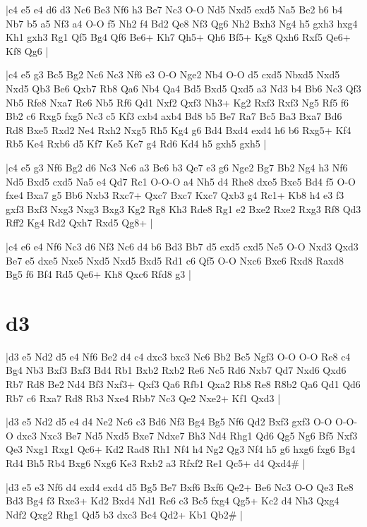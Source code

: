\whitename{}
\blackname{}
\makegametitle
|c4 e5 e4 d6 d3 Nc6 Be3 Nf6 h3 Be7 Nc3 O-O Nd5 Nxd5 exd5 Na5 Be2 b6 b4 Nb7 b5 a5 Nf3 a4 O-O f5 Nh2 f4 Bd2 Qe8 Nf3 Qg6 Nh2 Bxh3 Ng4 h5 gxh3 hxg4 Kh1 gxh3 Rg1 Qf5 Bg4 Qf6 Be6+ Kh7 Qh5+ Qh6 Bf5+ Kg8 Qxh6 Rxf5 Qe6+ Kf8 Qg6  |

\whitename{}
\blackname{}
\makegametitle
|c4 e5 g3 Bc5 Bg2 Nc6 Nc3 Nf6 e3 O-O Nge2 Nb4 O-O d5 cxd5 Nbxd5 Nxd5 Nxd5 Qb3 Be6 Qxb7 Rb8 Qa6 Nb4 Qa4 Bd5 Bxd5 Qxd5 a3 Nd3 b4 Bb6 Nc3 Qf3 Nb5 Rfe8 Nxa7 Re6 Nb5 Rf6 Qd1 Nxf2 Qxf3 Nh3+ Kg2 Rxf3 Rxf3 Ng5 Rf5 f6 Bb2 c6 Rxg5 fxg5 Nc3 c5 Kf3 cxb4 axb4 Bd8 b5 Be7 Ra7 Bc5 Ba3 Bxa7 Bd6 Rd8 Bxe5 Rxd2 Ne4 Rxh2 Nxg5 Rh5 Kg4 g6 Bd4 Bxd4 exd4 h6 b6 Rxg5+ Kf4 Rb5 Ke4 Rxb6 d5 Kf7 Ke5 Ke7 g4 Rd6 Kd4 h5 gxh5 gxh5  |



\whitename{}
\blackname{}
\makegametitle
|c4 e5 g3 Nf6 Bg2 d6 Nc3 Nc6 a3 Be6 b3 Qe7 e3 g6 Nge2 Bg7 Bb2 Ng4 h3 Nf6 Nd5 Bxd5 cxd5 Na5 e4 Qd7 Rc1 O-O-O a4 Nh5 d4 Rhe8 dxe5 Bxe5 Bd4 f5 O-O fxe4 Bxa7 g5 Bb6 Nxb3 Rxc7+ Qxc7 Bxc7 Kxc7 Qxb3 g4 Rc1+ Kb8 h4 e3 f3 gxf3 Bxf3 Nxg3 Nxg3 Bxg3 Kg2 Rg8 Kh3 Rde8 Rg1 e2 Bxe2 Rxe2 Rxg3 Rf8 Qd3 Rff2 Kg4 Rd2 Qxh7 Rxd5 Qg8+  |

\whitename{}
\blackname{}
\makegametitle
|c4 e6 e4 Nf6 Nc3 d6 Nf3 Nc6 d4 b6 Bd3 Bb7 d5 exd5 cxd5 Ne5 O-O Nxd3 Qxd3 Be7 e5 dxe5 Nxe5 Nxd5 Nxd5 Bxd5 Rd1 c6 Qf5 O-O Nxc6 Bxc6 Rxd8 Raxd8 Bg5 f6 Bf4 Rd5 Qe6+ Kh8 Qxc6 Rfd8 g3  |

\section{d3}

\whitename{}
\blackname{}
\makegametitle
|d3 e5 Nd2 d5 e4 Nf6 Be2 d4 c4 dxc3 bxc3 Nc6 Bb2 Bc5 Ngf3 O-O O-O Re8 c4 Bg4 Nb3 Bxf3 Bxf3 Bd4 Rb1 Bxb2 Rxb2 Re6 Nc5 Rd6 Nxb7 Qd7 Nxd6 Qxd6 Rb7 Rd8 Be2 Nd4 Bf3 Nxf3+ Qxf3 Qa6 Rfb1 Qxa2 Rb8 Re8 R8b2 Qa6 Qd1 Qd6 Rb7 c6 Rxa7 Rd8 Rb3 Nxe4 Rbb7 Nc3 Qe2 Nxe2+ Kf1 Qxd3  |

\whitename{}
\blackname{}
\makegametitle
|d3 e5 Nd2 d5 e4 d4 Ne2 Nc6 c3 Bd6 Nf3 Bg4 Bg5 Nf6 Qd2 Bxf3 gxf3 O-O O-O-O dxc3 Nxc3 Be7 Nd5 Nxd5 Bxe7 Ndxe7 Bh3 Nd4 Rhg1 Qd6 Qg5 Ng6 Bf5 Nxf3 Qe3 Nxg1 Rxg1 Qc6+ Kd2 Rad8 Rh1 Nf4 h4 Ng2 Qg3 Nf4 h5 g6 hxg6 fxg6 Bg4 Rd4 Bh5 Rb4 Bxg6 Nxg6 Ke3 Rxb2 a3 Rfxf2 Re1 Qc5+ d4 Qxd4\#  |

\whitename{}
\blackname{}
\makegametitle
|d3 e5 e3 Nf6 d4 exd4 exd4 d5 Bg5 Be7 Bxf6 Bxf6 Qe2+ Be6 Nc3 O-O Qe3 Re8 Bd3 Bg4 f3 Rxe3+ Kd2 Bxd4 Nd1 Re6 c3 Bc5 fxg4 Qg5+ Kc2 d4 Nh3 Qxg4 Ndf2 Qxg2 Rhg1 Qd5 b3 dxc3 Bc4 Qd2+ Kb1 Qb2\#  |

